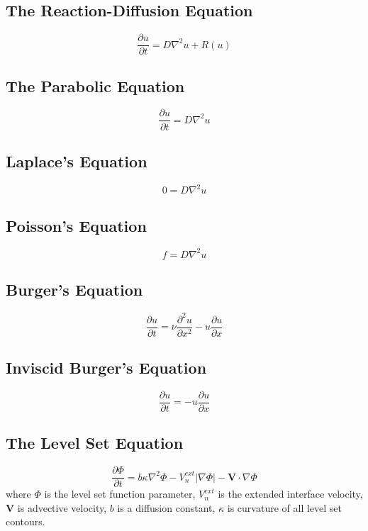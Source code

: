 \documentclass[12pt]{extarticle}
\begin{document}
\subsection*{The Reaction-Diffusion Equation}
\begin{equation}
\frac{\partial u}{\partial t} = D \nabla^{2} u + R(u) 
\end{equation}

\subsection*{The Parabolic Equation}
\begin{equation}
\frac{\partial u}{\partial t} = D \nabla^{2} u 
\end{equation}

\subsection*{Laplace's Equation}
\begin{equation}
0 = D \nabla^{2} u 
\end{equation}

\subsection*{Poisson's Equation}
\begin{equation}
f = D \nabla^{2} u 
\end{equation}

\subsection*{Burger's Equation}
\begin{equation}
    \frac{\partial u}{\partial t} = \nu \frac{\partial^{2} u}{\partial x^{2}} - u \frac{\partial u}{\partial x}  
\end{equation}

\subsection*{Inviscid Burger's Equation}
\begin{equation}
    \frac{\partial u}{\partial t} = - u \frac{\partial u}{\partial x}  
\end{equation}

\subsection*{The Level Set Equation}
\begin{equation}
\frac{\partial\Phi}{\partial t} = b \kappa \nabla^{2} \Phi - V_{n}^{ext}|\nabla \Phi | - \textbf{V} \cdot \nabla \Phi 
\label{sharpphasefield}
\end{equation}
where $\Phi$ is the level set function parameter, $V_{n}^{ext}$ is the extended interface velocity, $\textbf{V}$ is advective velocity, $b$ is a diffusion constant, $\kappa$ is curvature of all level set contours.
\end{document}
